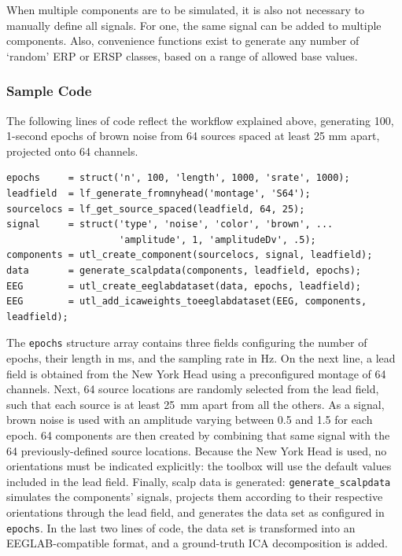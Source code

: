 When multiple components are to be simulated, it is also not necessary to manually define all signals. For one, the same signal can be added to multiple components. Also, convenience functions exist to generate any number of `random' ERP or ERSP classes, based on a range of allowed base values.


\subsubsection{Sample Code}

The following lines of code reflect the workflow explained above, generating 100, 1-second epochs of brown noise from 64 sources spaced at least 25 mm apart, projected onto 64 channels.

{\footnotesize
\begin{verbatim}
epochs     = struct('n', 100, 'length', 1000, 'srate', 1000);
leadfield  = lf_generate_fromnyhead('montage', 'S64');
sourcelocs = lf_get_source_spaced(leadfield, 64, 25);
signal     = struct('type', 'noise', 'color', 'brown', ...
                    'amplitude', 1, 'amplitudeDv', .5);
components = utl_create_component(sourcelocs, signal, leadfield);
data       = generate_scalpdata(components, leadfield, epochs);
EEG        = utl_create_eeglabdataset(data, epochs, leadfield);
EEG        = utl_add_icaweights_toeeglabdataset(EEG, components, leadfield);
\end{verbatim}
}

The \texttt{epochs} structure array contains three fields configuring the number of epochs, their length in ms, and the sampling rate in Hz. On the next line, a lead field is obtained from the New York Head using a preconfigured montage of 64 channels. Next, 64 source locations are randomly selected from the lead field, such that each source is at least 25~mm apart from all the others. As a signal, brown noise is used with an amplitude varying between 0.5 and 1.5 for each epoch. 64 components are then created by combining that same signal with the 64 previously-defined source locations. Because the New York Head is used, no orientations must be indicated explicitly: the toolbox will use the default values included in the lead field. Finally, scalp data is generated: \texttt{generate\_scalpdata} simulates the components' signals, projects them according to their respective orientations through the lead field, and generates the data set as configured in \texttt{epochs}. In the last two lines of code, the data set is transformed into an EEGLAB-compatible format, and a ground-truth ICA decomposition is added. 

